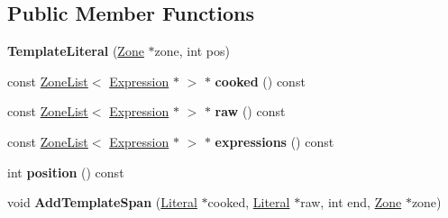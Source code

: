 \subsection*{Public Member Functions}
\begin{DoxyCompactItemize}
\item 
{\bfseries Template\+Literal} (\hyperlink{classv8_1_1internal_1_1_zone}{Zone} $\ast$zone, int pos)\hypertarget{classv8_1_1internal_1_1_parser_traits_1_1_template_literal_a3333db23b0525e21432ba675acc1c191}{}\label{classv8_1_1internal_1_1_parser_traits_1_1_template_literal_a3333db23b0525e21432ba675acc1c191}

\item 
const \hyperlink{classv8_1_1internal_1_1_zone_list}{Zone\+List}$<$ \hyperlink{classv8_1_1internal_1_1_expression}{Expression} $\ast$ $>$ $\ast$ {\bfseries cooked} () const \hypertarget{classv8_1_1internal_1_1_parser_traits_1_1_template_literal_a6a9945d62da0a95fd26e58f737dfde33}{}\label{classv8_1_1internal_1_1_parser_traits_1_1_template_literal_a6a9945d62da0a95fd26e58f737dfde33}

\item 
const \hyperlink{classv8_1_1internal_1_1_zone_list}{Zone\+List}$<$ \hyperlink{classv8_1_1internal_1_1_expression}{Expression} $\ast$ $>$ $\ast$ {\bfseries raw} () const \hypertarget{classv8_1_1internal_1_1_parser_traits_1_1_template_literal_a6ed10b348517544201af4f45dae1c797}{}\label{classv8_1_1internal_1_1_parser_traits_1_1_template_literal_a6ed10b348517544201af4f45dae1c797}

\item 
const \hyperlink{classv8_1_1internal_1_1_zone_list}{Zone\+List}$<$ \hyperlink{classv8_1_1internal_1_1_expression}{Expression} $\ast$ $>$ $\ast$ {\bfseries expressions} () const \hypertarget{classv8_1_1internal_1_1_parser_traits_1_1_template_literal_a25c45042627178ebf96319ade5a9ef72}{}\label{classv8_1_1internal_1_1_parser_traits_1_1_template_literal_a25c45042627178ebf96319ade5a9ef72}

\item 
int {\bfseries position} () const \hypertarget{classv8_1_1internal_1_1_parser_traits_1_1_template_literal_abb2532ec12439f6266f86ed52b8fd801}{}\label{classv8_1_1internal_1_1_parser_traits_1_1_template_literal_abb2532ec12439f6266f86ed52b8fd801}

\item 
void {\bfseries Add\+Template\+Span} (\hyperlink{classv8_1_1internal_1_1_literal}{Literal} $\ast$cooked, \hyperlink{classv8_1_1internal_1_1_literal}{Literal} $\ast$raw, int end, \hyperlink{classv8_1_1internal_1_1_zone}{Zone} $\ast$zone)\hypertarget{classv8_1_1internal_1_1_parser_traits_1_1_template_literal_afec421489324082487aff82733eafab4}{}\label{classv8_1_1internal_1_1_parser_traits_1_1_template_literal_afec421489324082487aff82733eafab4}


\end{DoxyCompactItemize}
